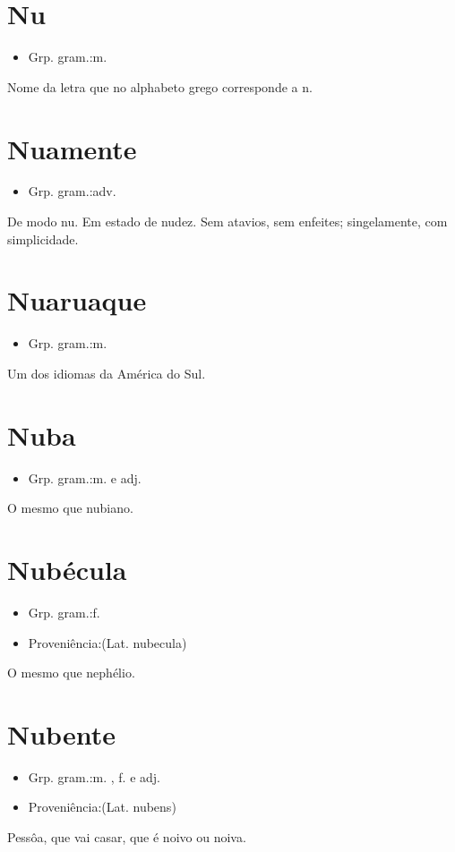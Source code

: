 \section{Nu}
\begin{itemize}
\item {Grp. gram.:m.}
\end{itemize}
Nome da letra que no alphabeto grego corresponde a \textunderscore n\textunderscore .
\section{Nuamente}
\begin{itemize}
\item {Grp. gram.:adv.}
\end{itemize}
De modo nu.
Em estado de nudez.
Sem atavios, sem enfeites; singelamente, com simplicidade.
\section{Nuaruaque}
\begin{itemize}
\item {Grp. gram.:m.}
\end{itemize}
Um dos idiomas da América do Sul.
\section{Nuba}
\begin{itemize}
\item {Grp. gram.:m.  e  adj.}
\end{itemize}
O mesmo que \textunderscore nubiano\textunderscore .
\section{Nubécula}
\begin{itemize}
\item {Grp. gram.:f.}
\end{itemize}
\begin{itemize}
\item {Proveniência:(Lat. \textunderscore nubecula\textunderscore )}
\end{itemize}
O mesmo que \textunderscore nephélio\textunderscore .
\section{Nubente}
\begin{itemize}
\item {Grp. gram.:m. ,  f.  e  adj.}
\end{itemize}
\begin{itemize}
\item {Proveniência:(Lat. \textunderscore nubens\textunderscore )}
\end{itemize}
Pessôa, que vai casar, que é noivo ou noiva.
